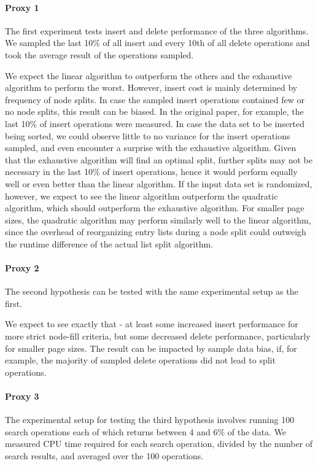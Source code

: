 \paragraph{Proxy 1}
The first experiment tests insert and delete performance of the three algorithms. We sampled the last 10\% of all insert and every 10th of all delete operations and took the average result of the operations sampled. 

We expect the linear algorithm to outperform the others and the exhaustive algorithm to perform the worst. However, insert cost is mainly determined by frequency of node splits. In case the sampled insert operations contained few or no node splits, this result can be biased. In the original paper, for example, the last 10\% of insert operations were measured. In case the data set to be inserted being sorted, we could observe little to no variance for the insert operations sampled, and even encounter a surprise with the exhaustive algorithm. Given that the exhaustive algorithm will find an optimal split, further splits may not be necessary in the last 10\% of insert operations, hence it would perform equally well or even better than the linear algorithm. If the input data set is randomized, however, we expect to see the linear algorithm outperform the quadratic algorithm, which should outperform the exhaustive algorithm. For smaller page sizes, the quadratic algorithm may perform similarly well to the linear algorithm, since the overhead of reorganizing entry lists during a node split could outweigh the runtime difference of the actual list split algorithm.

\paragraph{Proxy 2}
The second hypothesis can be tested with the same experimental setup as the first.

We expect to see exactly that - at least some increased insert performance for more strict node-fill criteria, but some decreased delete performance, particularly for smaller page sizes. The result can be impacted by sample data bias, if, for example, the majority of sampled delete operations did not lead to split operations. 

\paragraph{Proxy 3}
The experimental setup for testing the third hypothesis involves running 100 search operations each of which returns between 4 and 6\% of the data. We measured CPU time required for each search operation,  divided by the number of search results, and averaged over the 100 operations. 

